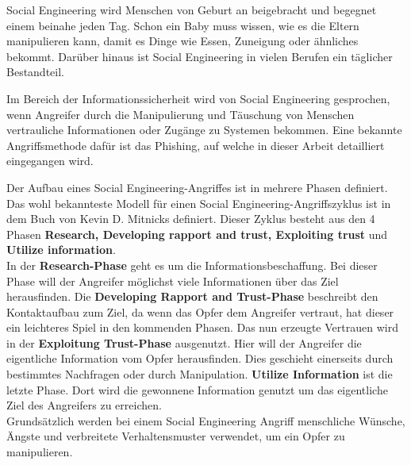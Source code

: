 	Social Engineering wird Menschen von Geburt an beigebracht und begegnet einem beinahe jeden Tag. Schon ein Baby muss wissen, wie es die Eltern manipulieren kann, damit es Dinge wie Essen, Zuneigung oder ähnliches bekommt. Darüber hinaus ist Social Engineering in vielen Berufen ein täglicher Bestandteil. %
	
	Im Bereich der Informationssicherheit wird von Social Engineering gesprochen, wenn Angreifer durch die Manipulierung und Täuschung von Menschen vertrauliche Informationen oder Zugänge zu Systemen bekommen. Eine bekannte Angriffsmethode dafür ist das Phishing, auf welche in dieser Arbeit detailliert eingegangen wird.

	Der Aufbau eines Social Engineering-Angriffes ist in mehrere Phasen definiert. Das wohl bekannteste Modell für einen Social Engineering-Angriffszyklus ist in dem Buch von Kevin D. Mitnicks \cite{ArtOfDeception} definiert. Dieser Zyklus besteht aus den 4 Phasen \textbf{Research, Developing rapport and trust, Exploiting trust} und \textbf{Utilize information}.\\
	In der \textbf{Research-Phase} geht es um die Informationsbeschaffung. Bei dieser Phase will der Angreifer möglichst viele Informationen über das Ziel herausfinden. Die \textbf{Developing Rapport and Trust-Phase} beschreibt den Kontaktaufbau zum Ziel, da wenn das Opfer dem Angreifer vertraut, hat dieser ein leichteres Spiel in den kommenden Phasen. Das nun erzeugte Vertrauen wird in der \textbf{Exploitung Trust-Phase} ausgenutzt. Hier will der Angreifer die eigentliche Information vom Opfer herausfinden. Dies geschieht einerseits durch bestimmtes Nachfragen oder durch Manipulation.
	\textbf{Utilize Information} ist die letzte Phase. Dort wird die gewonnene Information genutzt um das eigentliche Ziel des Angreifers zu erreichen.\\
	Grundsätzlich werden bei einem Social Engineering Angriff menschliche Wünsche, Ängste und verbreitete Verhaltensmuster verwendet, um ein Opfer zu manipulieren.\cite{LeitfadenSE}\\

